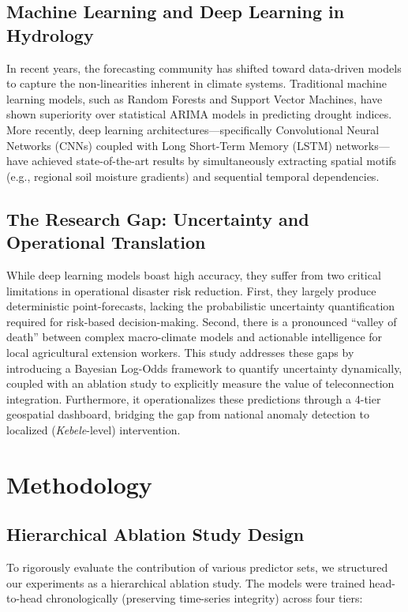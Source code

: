\documentclass[3p,times]{elsarticle}
\begin{document}
\subsection{Machine Learning and Deep Learning in Hydrology}
In recent years, the forecasting community has shifted toward data-driven models to capture the non-linearities inherent in climate systems. Traditional machine learning models, such as Random Forests and Support Vector Machines, have shown superiority over statistical ARIMA models in predicting drought indices. More recently, deep learning architectures---specifically Convolutional Neural Networks (CNNs) coupled with Long Short-Term Memory (LSTM) networks---have achieved state-of-the-art results by simultaneously extracting spatial motifs (e.g., regional soil moisture gradients) and sequential temporal dependencies. 

\subsection{The Research Gap: Uncertainty and Operational Translation}
While deep learning models boast high accuracy, they suffer from two critical limitations in operational disaster risk reduction. First, they largely produce deterministic point-forecasts, lacking the probabilistic uncertainty quantification required for risk-based decision-making. Second, there is a pronounced ``valley of death'' between complex macro-climate models and actionable intelligence for local agricultural extension workers. This study addresses these gaps by introducing a Bayesian Log-Odds framework to quantify uncertainty dynamically, coupled with an ablation study to explicitly measure the value of teleconnection integration. Furthermore, it operationalizes these predictions through a 4-tier geospatial dashboard, bridging the gap from national anomaly detection to localized (\textit{Kebele}-level) intervention.

\section{Methodology}

\subsection{Hierarchical Ablation Study Design}
To rigorously evaluate the contribution of various predictor sets, we structured our experiments as a hierarchical ablation study. The models were trained head-to-head chronologically (preserving time-series integrity) across four tiers:
\end{document}

